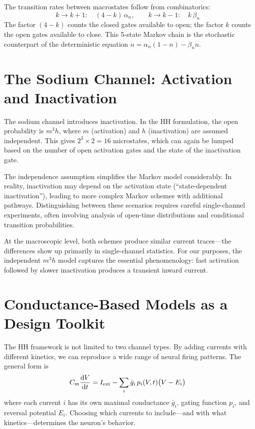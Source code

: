 The transition rates between macrostates follow from combinatorics:
%
\begin{equation}
  k \to k+1: \quad (4 - k)\,\alpha_n, \qquad
  k \to k-1: \quad k\,\beta_n
  \label{eq:k-channel-rates}
\end{equation}
%
The factor $(4 - k)$ counts the closed gates available to open; the factor $k$ counts the open gates available to close. This 5-state Markov chain is the stochastic counterpart of the deterministic equation $\dot{n} = \alpha_n(1 - n) - \beta_n n$.

\section{The Sodium Channel: Activation and Inactivation}
\label{sec:na-channel-markov}

The sodium channel introduces inactivation. In the HH formulation, the open probability is $m^3 h$, where $m$ (activation) and $h$ (inactivation) are assumed independent. This gives $2^3 \times 2 = 16$ microstates, which can again be lumped based on the number of open activation gates and the state of the inactivation gate.

The independence assumption simplifies the Markov model considerably. In reality, inactivation may depend on the activation state (``state-dependent inactivation''), leading to more complex Markov schemes with additional pathways. Distinguishing between these scenarios requires careful single-channel experiments, often involving analysis of open-time distributions and conditional transition probabilities.

At the macroscopic level, both schemes produce similar current traces---the differences show up primarily in single-channel statistics. For our purposes, the independent $m^3 h$ model captures the essential phenomenology: fast activation followed by slower inactivation produces a transient inward current.

\section{Conductance-Based Models as a Design Toolkit}
\label{sec:conductance-toolkit}

The HH framework is not limited to two channel types. By adding currents with different kinetics, we can reproduce a wide range of neural firing patterns. The general form is
%
\begin{equation}
  C_m\frac{\mathop{}\!\mathrm{d} V}{\mathop{}\!\mathrm{d} t} = I_{\text{ext}} - \sum_i \bar{g}_i\, p_i(V, t)\bigl(V - E_i\bigr)
  \label{eq:general-conductance}
\end{equation}
%
where each current $i$ has its own maximal conductance $\bar{g}_i$, gating function $p_i$, and reversal potential $E_i$. Choosing which currents to include---and with what kinetics---determines the neuron's behavior.

